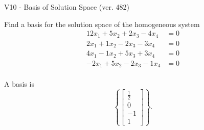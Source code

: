 \begin{exercise}
  \begin{exerciseTitle}V10 - Basis of Solution Space (ver. 482)\end{exerciseTitle}
  \begin{exerciseStatement}
    Find a basis for the solution space of the homogeneous system 
\begin{align*}
 12 x_ 1 + 5 x_ 2 + 2 x_ 3 -4 x_ 4 &= 0  \\ 
  2 x_ 1 + 1 x_ 2 -2 x_ 3 -3 x_ 4 &= 0  \\ 
  4 x_ 1 -1 x_ 2 + 5 x_ 3 + 3 x_ 4 &= 0  \\ 
  -2 x_ 1 + 5 x_ 2 -2 x_ 3 -1 x_ 4 &= 0  \\ 
 \end{align*}


 
  \end{exerciseStatement}

  \begin{exerciseAnswer}
   A basis is   
\[\left\{\left[\begin{array}{c}
\frac{1}{2} \\
0 \\
-1 \\
1
\end{array}\right]\right\}.\]

  


  \end{exerciseAnswer}
\end{exercise}